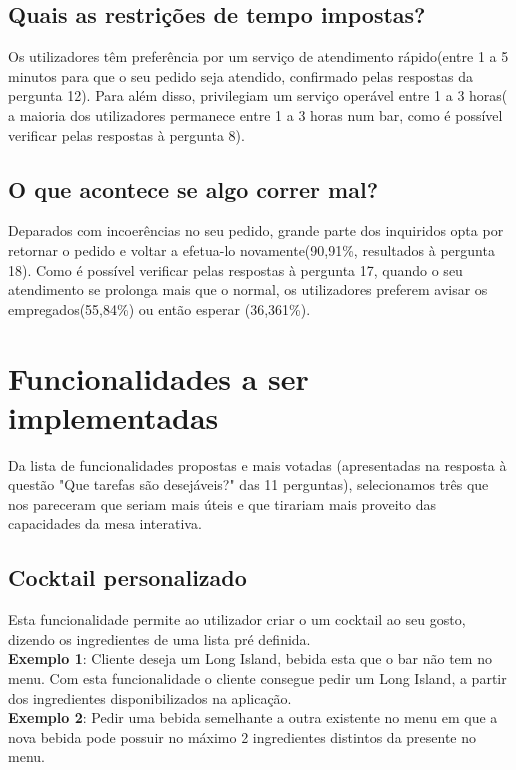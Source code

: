 \documentclass{article}
\begin{document}
\subsection*{Quais as restrições de tempo impostas?}
Os utilizadores têm preferência por um serviço de atendimento rápido(entre 1 a 5 minutos para que o seu pedido seja atendido, confirmado pelas respostas da pergunta 12). Para além disso, privilegiam um serviço operável entre 1 a 3 horas( a maioria dos utilizadores permanece entre 1 a 3 horas num bar, como é possível verificar pelas respostas à pergunta 8).
\subsection*{O que acontece se algo correr mal?}
Deparados com incoerências no seu pedido, grande parte dos inquiridos opta por retornar o pedido e voltar a efetua-lo novamente(90,91\%, resultados à pergunta 18). Como é possível verificar pelas respostas à pergunta 17, quando o seu atendimento se prolonga mais que o normal, os utilizadores preferem avisar os empregados(55,84\%) ou então esperar (36,361\%).

\section*{Funcionalidades a ser implementadas}

Da lista de funcionalidades propostas e mais votadas (apresentadas na resposta à questão "Que tarefas são desejáveis?" das 11 perguntas), selecionamos três que nos pareceram que seriam mais úteis e que tirariam mais proveito das capacidades da mesa interativa.

\subsection*{Cocktail personalizado}
Esta funcionalidade permite ao utilizador criar o um cocktail ao seu gosto, dizendo os ingredientes de uma lista pré definida.\\
\textbf{Exemplo 1}: Cliente deseja um Long Island, bebida esta que o bar não tem no menu. Com esta funcionalidade o cliente consegue pedir um Long Island, a partir dos ingredientes disponibilizados na aplicação.\\
\textbf{Exemplo 2}: Pedir uma bebida semelhante a outra existente no menu em que a nova bebida pode possuir no máximo 2 ingredientes distintos da presente no menu. 
\\
\end{document}
